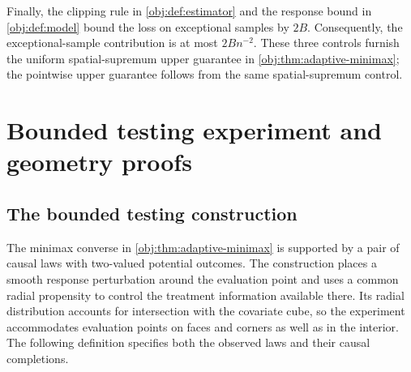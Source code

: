 \documentclass[11pt]{article}
\begin{document}
Finally, the clipping rule in \cref{obj:def:estimator} and the response bound in \cref{obj:def:model} bound the loss on exceptional samples by \(2B\). Consequently, the exceptional-sample contribution is at most \(2Bn^{-2}\). These three controls furnish the uniform spatial-supremum upper guarantee in \cref{obj:thm:adaptive-minimax}; the pointwise upper guarantee follows from the same spatial-supremum control.


\section{Bounded testing experiment and geometry proofs}

\subsection{The bounded testing construction}

The minimax converse in \cref{obj:thm:adaptive-minimax} is supported by a pair of causal laws with two-valued potential outcomes. The construction places a smooth response perturbation around the evaluation point and uses a common radial propensity to control the treatment information available there. Its radial distribution accounts for intersection with the covariate cube, so the experiment accommodates evaluation points on faces and corners as well as in the interior. The following definition specifies both the observed laws and their causal completions.
\end{document}
